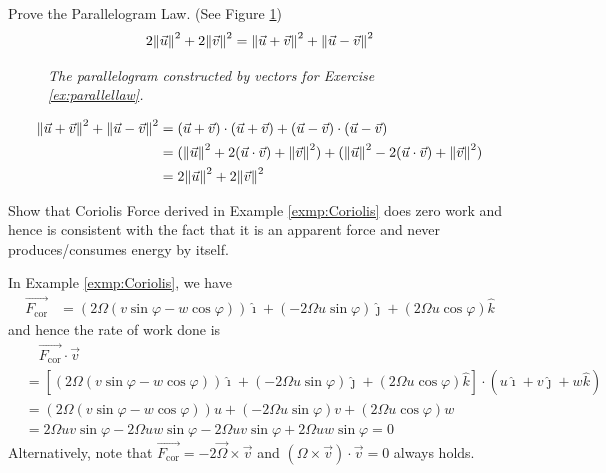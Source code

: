\begin{Exercise}
\label{ex:parallellaw}
Prove the Parallelogram Law. (See Figure \ref{fig:parallellaw})
\begin{align}
2\norm{\vec{u}}^2 + 2\norm{\vec{v}}^2 = \norm{\vec{u}+\vec{v}}^2 + \norm{\vec{u}-\vec{v}}^2
\end{align}
\end{Exercise}
\begin{figure}
\centering
{}
\caption{\textit{The parallelogram constructed by vectors for Exercise \ref{ex:parallellaw}.}}
\label{fig:parallellaw}
\end{figure}
\begin{Answer}
\begin{align*}
\norm{\vec{u}+\vec{v}}^2 + \norm{\vec{u}-\vec{v}}^2 &= (\vec{u}+\vec{v}) \cdot (\vec{u}+\vec{v}) + (\vec{u}-\vec{v}) \cdot (\vec{u}-\vec{v}) \\
&= (\norm{\vec{u}}^2 + 2(\vec{u} \cdot \vec{v}) + \norm{\vec{v}}^2) + (\norm{\vec{u}}^2 - 2(\vec{u} \cdot \vec{v}) + \norm{\vec{v}}^2) \\
&= 2\norm{\vec{u}}^2 + 2\norm{\vec{v}}^2
\end{align*}
\end{Answer}

\begin{Exercise}
Show that Coriolis Force derived in Example \ref{exmp:Coriolis} does zero work and hence is consistent with the fact that it is an apparent force and never produces/consumes energy by itself.
\end{Exercise}
\begin{Answer}
In Example \ref{exmp:Coriolis}, we have
\begin{align*}
\overrightarrow{F_\text{cor}} &= (2\Omega(v\sin\varphi - w\cos\varphi))\hat{\imath} + (-2\Omega u\sin\varphi)\hat{\jmath} + (2\Omega u\cos\varphi)\hat{k}    
\end{align*}
and hence the rate of work done is
\begin{align*}
&\quad \overrightarrow{F_\text{cor}} \cdot \vec{v} \\
&= [(2\Omega(v\sin\varphi - w\cos\varphi))\hat{\imath} + (-2\Omega u\sin\varphi)\hat{\jmath} + (2\Omega u\cos\varphi)\hat{k}] \cdot (u\hat{\imath} + v\hat{\jmath} + w\hat{k}) \\
&= (2\Omega(v\sin\varphi - w\cos\varphi))u + (-2\Omega u\sin\varphi)v + (2\Omega u\cos\varphi)w \\
&= 2\Omega uv\sin\varphi - 2\Omega uw\sin\varphi - 2\Omega uv\sin\varphi + 2\Omega uw\sin\varphi = 0
\end{align*}
Alternatively, note that $\overrightarrow{F_\text{cor}} = -2\overrightarrow{\Omega} \times \vec{v}$ and $({\Omega} \times \vec{v}) \cdot \vec{v} = 0$ always holds.
\end{Answer}